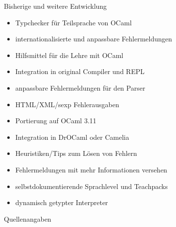 \documentclass
[handout]
{beamer}
\begin{document}
\begin{frame}{Bisherige und weitere Entwicklung}
  \begin{itemize}
    \item[\checkmark] Typchecker für Teilsprache von OCaml
    \item[\checkmark] internationalisierte und anpassbare Fehlermeldungen
    \item[\checkmark] Hilfsmittel für die Lehre mit OCaml
    \item[\checkmark] Integration in original Compiler und REPL
    \item[\checkmark] anpassbare Fehlermeldungen für den Parser
    \item[\checkmark] HTML/XML/sexp Fehlerausgaben
    \item[\checkmark] Portierung auf OCaml 3.11
    \pause
    \item Integration in DrOCaml oder Camelia
    \item Heuristiken/Tips zum Lösen von Fehlern
    \item Fehlermeldungen mit mehr Informationen versehen
    \item selbstdokumentierende Sprachlevel und Teachpacks
    \item dynamisch getypter Interpreter
  \end{itemize}
\end{frame}


\begin{frame}{Quellenangaben}
  \nocite{leroy2008}
  \nocite{haackwells04}
  \nocite{helium-hw03}
  \nocite{Felleisen98thedrscheme}
  
  \clearpage
\end{frame}
\end{document}

